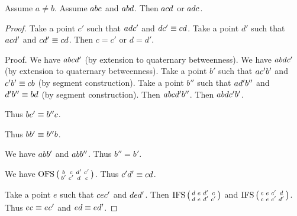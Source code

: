\documentclass[10pt,a4paper,parskip=half,numbers=endperiod,parskip]{scrartcl}
\begin{document}

  \begin{forthel}
    \begin{theorem} %
      Assume $a \neq b$.
      Assume $a b c$ and $a b d$.
      Then $a c d$ or $a d c$.
    \end{theorem}

    \begin{proof}
      Take a point $c'$ such that
        $a d c'$ and $d c' \equiv c d$.
      Take a point $d'$ such that
        $a c d'$ and $c d' \equiv c d$.
      Then $c = c'$ or $d = d'$.

      Proof.
        We have $a b c d'$ (by extension to quaternary betweenness).
        We have $a b d c'$ (by extension to quaternary betweenness).
        Take a point $b'$ such that
          $a c' b'$ and
          $c' b' \equiv c b$ (by segment construction).
        Take a point $b''$ such that
          $a d' b''$ and
          $d' b'' \equiv b d$ (by segment construction).
        Then $a b c d' b''$.
        Then $a b d c' b'$.

        Thus $b c' \equiv b'' c$.

        Thus $b b' \equiv b'' b$.

        We have $a b b'$ and $a b b''$.
        Thus $b'' = b'$. %

        We have $\operatorname{OFS} \left( \begin{smallmatrix} b & c & d' & c' \\ b' & c' & d & c \end{smallmatrix} \right)$.
        Thus $c' d' \equiv c d$.

        Take a point $e$ such that
          $c e c'$ and $d e d'$.
        Then $\operatorname{IFS} \left( \begin{smallmatrix} d & e & d' & c \\ d & e & d' & c' \end{smallmatrix} \right)$
        and $\operatorname{IFS} \left( \begin{smallmatrix} c & e & c' & d \\ c & e & c' & d' \end{smallmatrix} \right)$.
        Thus $e c \equiv e c'$ and $e d \equiv e d'$.


\end{proof}
\end{forthel}
\end{document}
